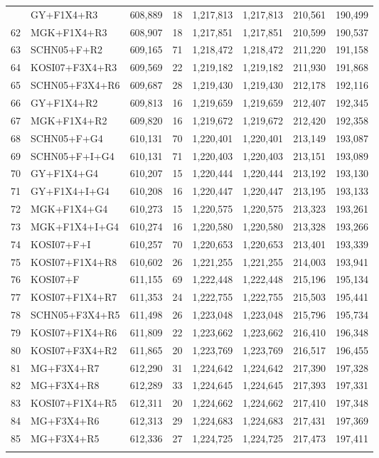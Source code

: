 \begin{longtable}{rlrrrrrr}
{61&GY+F1X4+R3&608,889&18&1,217,813&1,217,813&210,561&190,499\\
62&MGK+F1X4+R3&608,907&18&1,217,851&1,217,851&210,599&190,537\\
63&SCHN05+F+R2&609,165&71&1,218,472&1,218,472&211,220&191,158\\
64&KOSI07+F3X4+R3&609,569&22&1,219,182&1,219,182&211,930&191,868\\
65&SCHN05+F3X4+R6&609,687&28&1,219,430&1,219,430&212,178&192,116\\
66&GY+F1X4+R2&609,813&16&1,219,659&1,219,659&212,407&192,345\\
67&MGK+F1X4+R2&609,820&16&1,219,672&1,219,672&212,420&192,358\\
68&SCHN05+F+G4&610,131&70&1,220,401&1,220,401&213,149&193,087\\
69&SCHN05+F+I+G4&610,131&71&1,220,403&1,220,403&213,151&193,089\\
70&GY+F1X4+G4&610,207&15&1,220,444&1,220,444&213,192&193,130\\
71&GY+F1X4+I+G4&610,208&16&1,220,447&1,220,447&213,195&193,133\\
72&MGK+F1X4+G4&610,273&15&1,220,575&1,220,575&213,323&193,261\\
73&MGK+F1X4+I+G4&610,274&16&1,220,580&1,220,580&213,328&193,266\\
74&KOSI07+F+I&610,257&70&1,220,653&1,220,653&213,401&193,339\\
75&KOSI07+F1X4+R8&610,602&26&1,221,255&1,221,255&214,003&193,941\\
76&KOSI07+F&611,155&69&1,222,448&1,222,448&215,196&195,134\\
77&KOSI07+F1X4+R7&611,353&24&1,222,755&1,222,755&215,503&195,441\\
78&SCHN05+F3X4+R5&611,498&26&1,223,048&1,223,048&215,796&195,734\\
79&KOSI07+F1X4+R6&611,809&22&1,223,662&1,223,662&216,410&196,348\\
80&KOSI07+F3X4+R2&611,865&20&1,223,769&1,223,769&216,517&196,455\\
81&MG+F3X4+R7&612,290&31&1,224,642&1,224,642&217,390&197,328\\
82&MG+F3X4+R8&612,289&33&1,224,645&1,224,645&217,393&197,331\\
83&KOSI07+F1X4+R5&612,311&20&1,224,662&1,224,662&217,410&197,348\\
84&MG+F3X4+R6&612,313&29&1,224,683&1,224,683&217,431&197,369\\
85&MG+F3X4+R5&612,336&27&1,224,725&1,224,725&217,473&197,411\\
}
\end{longtable}
